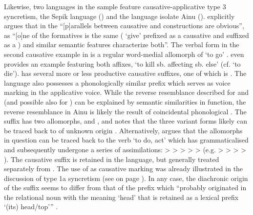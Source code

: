 Likewise, two languages in the sample feature causative-applicative type 3 syncretism, the Sepik language  () and the language isolate Ainu (). \cite[254]{bruce:1979} explicitly argues that in  the “[p]arallels between causative and  constructions are obvious”, as “[o]ne of the formatives is the same ( ‘give’ prefixed as a causative and suffixed as a ) and similar semantic features characterize both”. The verbal form  in the second  causative example in  is a regular word-medial allomorph of  ‘to go’ \citep[250]{bruce:1979}. \cite[358]{bruce:1979} even provides an example featuring both affixes,  ‘to kill sb. affecting sb. else’ (cf.  ‘to die’).  has several more or less productive causative suffixes, one of which is . The language also possesses a phonologically similar prefix  which serves as voice marking in the applicative voice. While the reverse resemblance described for  and  (and possible also for ) can be explained by semantic similarities in function, the reverse resemblance in Ainu is likely the result of coincidental phonological . The suffix  has two allomorphs,  and , and \cite[475]{bugaeva:2015} notes that the three variant forms likely can be traced back to   of unknown origin \citep{vovin:1993}. Alternatively, \cite[15ff.]{nonno:2015} argues that the allomorphs in question can be traced back to the verb  ‘to do, act’ which has grammaticalised and subsequently undergone a series of assimilations:  >  >  >  >  >  (e.g.   >  >  >  > ). The causative suffix  is retained in the language, but generally treated separately from  \citep{bugaeva:2015}. The use of  as causative marking was already illustrated in the discussion of type 1a syncretism (see  on page \pageref{tab:ch3:type1a-examples-2}). In any case, the diachronic origin of the suffix  seems to differ from that of the prefix  which “probably originated in the relational noun with the meaning ‘head’ that is retained as a lexical prefix  ‘(its) head/top’” \citep[762]{bugaeva:2010}.


